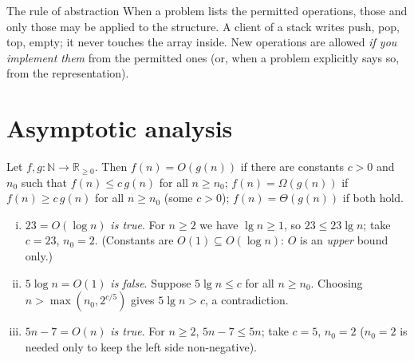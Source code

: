 \begin{note}{The rule of abstraction}
When a problem lists the permitted operations, those and only those may be applied to
the structure. A client of a stack writes push, pop, top, empty; it never touches the
array inside. New operations are allowed \emph{if you implement them} from the permitted
ones (or, when a problem explicitly says so, from the representation).
\end{note}

\section{Asymptotic analysis}

\begin{definition}
Let $f,g:\mathbb N\to\mathbb R_{\ge 0}$. Then $f(n)=O(g(n))$ if there are constants
$c>0$ and $n_0$ such that $f(n)\le c\,g(n)$ for all $n\ge n_0$; $f(n)=\Omega(g(n))$ if
$f(n)\ge c\,g(n)$ for all $n\ge n_0$ (some $c>0$); $f(n)=\Theta(g(n))$ if both hold.
\end{definition}

\begin{example}\leavevmode
\begin{enumerate}[(i)]
\item $23=O(\log n)$ \emph{is true}. For $n\ge2$ we have $\lg n\ge1$, so
  $23\le23\lg n$; take $c=23$, $n_0=2$. (Constants are $O(1)\subseteq O(\log n)$: $O$
  is an \emph{upper} bound only.)
\item $5\log n=O(1)$ \emph{is false}. Suppose $5\lg n\le c$ for all $n\ge n_0$.
  Choosing $n>\max(n_0,2^{c/5})$ gives $5\lg n>c$, a contradiction.
\item $5n-7=O(n)$ \emph{is true}. For $n\ge2$, $5n-7\le5n$; take $c=5$, $n_0=2$
  ($n_0=2$ is needed only to keep the left side non-negative).
\end{enumerate}
\end{example}

